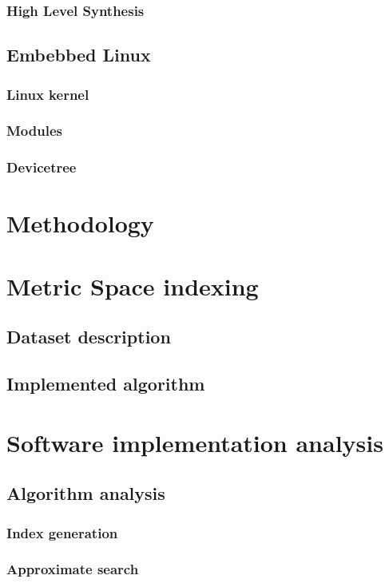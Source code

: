 \documentclass{iccmemoria}
\begin{document}
    \subsection{High Level Synthesis}
  \section{Embebbed Linux}
    \subsection{Linux kernel}
    \subsection{Modules}
    \subsection{Devicetree}

\chapter{Methodology}
   
  
\chapter{Metric Space indexing}
  \section{Dataset description}
  \section{Implemented algorithm}

\chapter{Software implementation analysis}
  \section{Algorithm analysis}
    \subsection{Index generation}
    \subsection{Approximate search}
\end{document}
